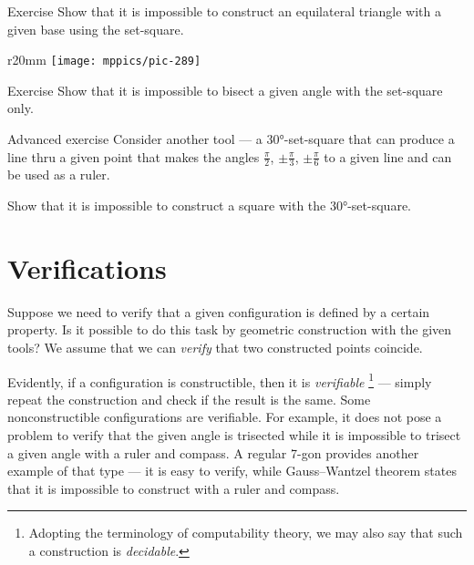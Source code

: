 \begin{thm}{Exercise}\label{ex:equilateral triangle}
Show that it is impossible to construct an equilateral triangle with a given base using
the set-square.
\end{thm}

{

\begin{wrapfigure}{r}{20mm}
\vskip-8mm
\centering
\texttt{[image: mppics/pic-289]}
\end{wrapfigure}


\begin{thm}{Exercise}\label{ex:set-square-bisect}
Show that it is impossible to bisect a given angle with the set-square only.
\end{thm}

\begin{thm}{Advanced exercise}\label{ex:90-60-30}
Consider another tool --- a 30°-set-square that can produce a line thru a given point
that makes the angles
$\tfrac\pi2$, $\pm\tfrac\pi3$, $\pm\tfrac\pi6$
to a given line and can be used as a ruler.

{Show that it is impossible to construct a square with the 30°-set-square.}
\end{thm}

}

\section{Verifications}
\label{sec:verification}

Suppose we need to verify that a given configuration is defined by a certain property. 
Is it possible to do this task by geometric construction with the given tools?
We assume that we can \textit{verify} that two constructed points coincide.

Evidently, if a configuration is constructible, then it is \emph{verifiable}%
\footnote{Adopting the terminology of computability theory, we may also say that such a construction is \emph{decidable}.} --- simply repeat the construction and check if the result is the same.
Some nonconstructible configurations are verifiable.
For example, it does not pose a problem to verify that the given angle is trisected while it is impossible to trisect a given angle with a ruler and compass.
A regular 7-gon provides another example of that type --- it is easy to verify, while Gauss--Wantzel theorem states that it is impossible to construct with a ruler and compass.


